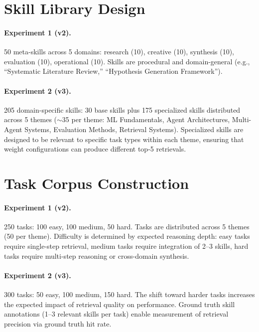 \section{Skill Library Design}
\label{app:skills}

\paragraph{Experiment 1 (v2).}
50 meta-skills across 5 domains: research (10), creative (10), synthesis (10), evaluation (10), operational (10).
Skills are procedural and domain-general (e.g., ``Systematic Literature Review,'' ``Hypothesis Generation Framework'').

\paragraph{Experiment 2 (v3).}
205 domain-specific skills: 30 base skills plus 175 specialized skills distributed across 5 themes (${\sim}$35 per theme: ML Fundamentals, Agent Architectures, Multi-Agent Systems, Evaluation Methods, Retrieval Systems).
Specialized skills are designed to be relevant to specific task types within each theme, ensuring that weight configurations can produce different top-5 retrievals.

\section{Task Corpus Construction}
\label{app:tasks}

\paragraph{Experiment 1 (v2).}
250 tasks: 100 easy, 100 medium, 50 hard.
Tasks are distributed across 5 themes (50 per theme).
Difficulty is determined by expected reasoning depth: easy tasks require single-step retrieval, medium tasks require integration of 2--3 skills, hard tasks require multi-step reasoning or cross-domain synthesis.

\paragraph{Experiment 2 (v3).}
300 tasks: 50 easy, 100 medium, 150 hard.
The shift toward harder tasks increases the expected impact of retrieval quality on performance.
Ground truth skill annotations (1--3 relevant skills per task) enable measurement of retrieval precision via ground truth hit rate.

